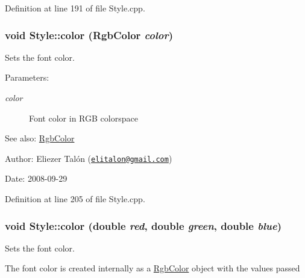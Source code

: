 Definition at line 191 of file Style.cpp.\hypertarget{class_style_0f557c5b3ea0a3320dd71d476a004bac}{
\subsubsection[color]{\setlength{\rightskip}{0pt plus 5cm}void Style::color ({\bf RgbColor} {\em color})}}
\label{class_style_0f557c5b3ea0a3320dd71d476a004bac}


Sets the font color. 

\begin{Desc}
\item[Parameters:]
\begin{description}
\item[{\em color}]Font color in RGB colorspace\end{description}
\end{Desc}
\begin{Desc}
\item[See also:]\hyperlink{struct_rgb_color}{RgbColor}\end{Desc}
\begin{Desc}
\item[Author:]Eliezer Talón (\href{mailto:elitalon@gmail.com}{\tt elitalon@gmail.com}) \end{Desc}
\begin{Desc}
\item[Date:]2008-09-29 \end{Desc}


Definition at line 205 of file Style.cpp.\hypertarget{class_style_a32d9527a9ce8b50eb8e7d128fce578f}{
\subsubsection[color]{\setlength{\rightskip}{0pt plus 5cm}void Style::color (double {\em red}, \/  double {\em green}, \/  double {\em blue})}}
\label{class_style_a32d9527a9ce8b50eb8e7d128fce578f}


Sets the font color. 

The font color is created internally as a \hyperlink{struct_rgb_color}{RgbColor} object with the values passed

